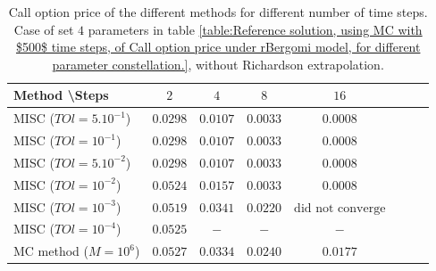\documentclass[11pt]{article}
\begin{document}
\begin{table}[h!]
	\centering
	\begin{tabular}{l*{6}{c}r}
		Method \textbackslash  Steps            & $2$ & $4$ & $8$ & $16$ &   \\
		\hline
		MISC ($TOl=5.10^{-1}$)  & $0.0298$ & $0.0107$ & $0.0033$ & $0.0008$  \\
		MISC ($TOl=10^{-1}$)  & $0.0298$ & $0.0107$ & $0.0033$ & $0.0008$   \\
		MISC ($TOl=5.10^{-2}$)  &$0.0298$ & $0.0107$ & $0.0033$ & $0.0008$  \\
		MISC ($TOl=10^{-2}$)  & $0.0524$ & $0.0157$ & $0.0033$ & $0.0008$  \\
		MISC ($TOl=10^{-3}$)  & $0.0519$ & $0.0341$ & $0.0220$ & $\text{did not converge}$  \\
		MISC ($TOl=10^{-4}$)  & $0.0525$ & $-$ & $-$ & $-$  \\
		\hline
		MC method ($M=10^{6}$)   & $    0.0527$ & $0.0334$  & $ 0.0240$ & $  0.0177$ \\		
		
		\hline
	\end{tabular}
	\caption{ Call option price of the different methods for different number of time steps. Case of set $4$ parameters in table \ref{table:Reference solution, using MC with $500$ time steps, of Call option price under rBergomi model, for different parameter constellation.}, without Richardson extrapolation.}
	\label{table: Call option price of the different methods for different number of time steps. Case set 4}
\end{table}
\end{document}
